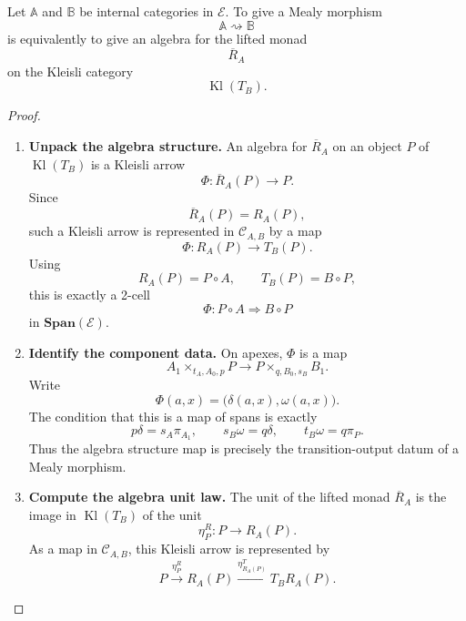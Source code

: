 \begin{theorem}
\label{thm:mealy-morphisms-kleisli-algebras}
    Let \(\mathbb A\) and \(\mathbb B\) be internal categories in
    \(\mathcal E\). To give a Mealy morphism
    \[
        \mathbb A\rightsquigarrow\mathbb B
    \]
    is equivalently to give an algebra for the lifted monad
    \[
        \overline R_A
    \]
    on the Kleisli category
    \[
        \operatorname{Kl}(T_B).
    \]
\end{theorem}
\begin{proof}
    \leavevmode
    \begin{enumerate}
        \item \textbf{Unpack the algebra structure.}
        An algebra for \(\overline R_A\) on an object \(P\) of
        \(\operatorname{Kl}(T_B)\) is a Kleisli arrow
        \[
            \Phi:
            \overline R_A(P)\to P.
        \]
        Since
        \[
            \overline R_A(P)=R_A(P),
        \]
        such a Kleisli arrow is represented in
        \(\mathcal C_{A,B}\) by a map
        \[
            \Phi:
            R_A(P)\to T_B(P).
        \]
        Using
        \[
            R_A(P)=P\circ A,
            \qquad
            T_B(P)=B\circ P,
        \]
        this is exactly a 2-cell
        \[
            \Phi:
            P\circ A\Rightarrow B\circ P
        \]
        in \(\mathbf{Span}(\mathcal E)\).

        \item \textbf{Identify the component data.}
        On apexes, \(\Phi\) is a map
        \[
            A_1\times_{t_A,A_0,p}P
            \longrightarrow
            P\times_{q,B_0,s_B}B_1.
        \]
        Write
        \[
            \Phi(a,x)
            =
            \bigl(\delta(a,x),\omega(a,x)\bigr).
        \]
        The condition that this is a map of spans is exactly
        \[
            p\delta=s_A\pi_{A_1},
            \qquad
            s_B\omega=q\delta,
            \qquad
            t_B\omega=q\pi_P.
        \]
        Thus the algebra structure map is precisely the transition-output datum
        of a Mealy morphism.

        \item \textbf{Compute the algebra unit law.}
        The unit of the lifted monad \(\overline R_A\) is the image in
        \(\operatorname{Kl}(T_B)\) of the unit
        \[
            \eta^R_P:P\to R_A(P).
        \]
        As a map in \(\mathcal C_{A,B}\), this Kleisli arrow is represented by
        \[
            P
            \xrightarrow{\eta^R_P}
            R_A(P)
            \xrightarrow{\eta^T_{R_A(P)}}
            T_B R_A(P).
        \]


\end{enumerate}
\end{proof}
